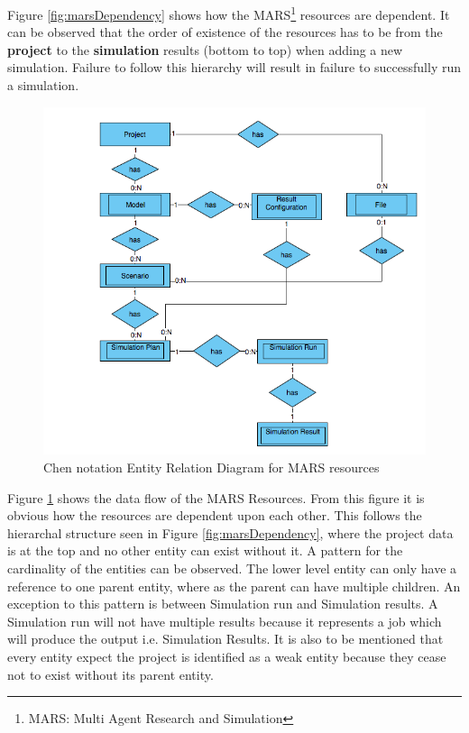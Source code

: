        Figure \ref{fig:marsDependency} shows how the MARS\footnote{MARS: Multi Agent Research and Simulation} 
        resources are dependent. It can be observed
        that the order of existence of the resources has to be from the \textbf{project} to the \textbf{simulation} results 
        (bottom to top) when adding a new simulation. Failure to follow this hierarchy will result in failure to
        successfully run a simulation.

        \begin{figure}[H]
            \centering \includegraphics[scale=0.6]{grafiken/ERMars.png}
            \caption{Chen notation Entity Relation Diagram for MARS resources}
            \label{fig:ERMars}
        \end{figure}
        
        Figure \ref{fig:ERMars} shows the data flow of the MARS Resources. From this figure it is obvious 
        how the resources are dependent upon each other. This follows the hierarchal structure seen in Figure \ref{fig:marsDependency},
        where the project data is at the top and no other entity can exist without it. A pattern for the cardinality of the entities can be observed.
        The lower level entity can only have a reference to one parent entity, where as the parent can have multiple children. An exception to this
        pattern is between Simulation run and Simulation results. A Simulation run will not have multiple results because it represents a job which will produce
        the output i.e. Simulation Results. It is also to be mentioned that every entity expect the project is identified as a weak entity because they cease not 
        to exist without its parent entity. 

